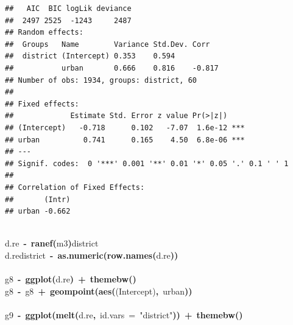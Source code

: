 \documentclass{article}
\makeatletter
\newcommand{\hlfunctioncall}[1]{\textcolor[rgb]{.5,0,.33}{\textbf{#1}}}%
\newcommand{\hlstring}[1]{\textcolor[rgb]{.6,.6,1}{#1}}%
\newcommand{\hlkeyword}[1]{\textbf{#1}}%
\newcommand{\hlargument}[1]{\textcolor[rgb]{.69,.25,.02}{#1}}%
\newcommand{\hlassignement}[1]{\textbf{#1}}%
\newcommand{\hlsymbol}[1]{#1}%
\newcommand{\hlstd}[1]{\textcolor[rgb]{0,0,0}{#1}}%
\newenvironment{kframe}{%
 \def\FrameCommand##1{\hskip\@totalleftmargin \hskip-\fboxsep
 \colorbox{shadecolor}{##1}\hskip-\fboxsep
     \hskip-\linewidth \hskip-\@totalleftmargin \hskip\columnwidth}%
 \MakeFramed {\advance\hsize-\width
   \@totalleftmargin\z@ \linewidth\hsize
   \@setminipage}}%
 {\par\unskip\endMakeFramed}
\newenvironment{knitrout}{}{} %
\makeatother
\begin{document}
\begin{knitrout}
{\begin{kframe}
\begin{verbatim}
##   AIC  BIC logLik deviance
##  2497 2525  -1243     2487
## Random effects:
##  Groups   Name        Variance Std.Dev. Corr   
##  district (Intercept) 0.353    0.594           
##           urban       0.666    0.816    -0.817 
## Number of obs: 1934, groups: district, 60
## 
## Fixed effects:
##             Estimate Std. Error z value Pr(>|z|)    
## (Intercept)   -0.718      0.102   -7.07  1.6e-12 ***
## urban          0.741      0.165    4.50  6.8e-06 ***
## ---
## Signif. codes:  0 '***' 0.001 '**' 0.01 '*' 0.05 '.' 0.1 ' ' 1 
## 
## Correlation of Fixed Effects:
##       (Intr)
## urban -0.662
\end{verbatim}
\begin{flushleft}
\ttfamily\noindent
\hspace*{\fill}\\
\hlstd{}\hlsymbol{d.re}{\ }\hlassignement{\usebox{\hlnormalsizeboxlessthan}-}{\ }\hlfunctioncall{ranef}\hlkeyword{(}\hlsymbol{m3}\hlkeyword{)}\hlkeyword{\usebox{\hlnormalsizeboxdollar}}\hlsymbol{district}\hspace*{\fill}\\
\hlstd{}\hlsymbol{d.re}\hlkeyword{\usebox{\hlnormalsizeboxdollar}}\hlsymbol{district}{\ }\hlassignement{\usebox{\hlnormalsizeboxlessthan}-}{\ }\hlfunctioncall{as.numeric}\hlkeyword{(}\hlfunctioncall{row.names}\hlkeyword{(}\hlsymbol{d.re}\hlkeyword{)}\hlkeyword{)}\hspace*{\fill}\\
\hlstd{}\hspace*{\fill}\\
\hlstd{}\hlsymbol{g8}{\ }\hlassignement{\usebox{\hlnormalsizeboxlessthan}-}{\ }\hlfunctioncall{ggplot}\hlkeyword{(}\hlsymbol{d.re}\hlkeyword{)}{\ }\hlkeyword{+}{\ }\hlfunctioncall{theme\usebox{\hlnormalsizeboxunderscore}bw}\hlkeyword{(}\hlkeyword{)}\hspace*{\fill}\\
\hlstd{}\hlsymbol{g8}{\ }\hlassignement{\usebox{\hlnormalsizeboxlessthan}-}{\ }\hlsymbol{g8}{\ }\hlkeyword{+}{\ }\hlfunctioncall{geom\usebox{\hlnormalsizeboxunderscore}point}\hlkeyword{(}\hlfunctioncall{aes}\hlkeyword{(}\hlsymbol{\usebox{\hlnormalsizeboxbacktick}(Intercept)\usebox{\hlnormalsizeboxbacktick}}\hlkeyword{,}{\ }\hlsymbol{urban}\hlkeyword{)}\hlkeyword{)}\hspace*{\fill}\\
\hlstd{}\hspace*{\fill}\\
\hlstd{}\hlsymbol{g9}{\ }\hlassignement{\usebox{\hlnormalsizeboxlessthan}-}{\ }\hlfunctioncall{ggplot}\hlkeyword{(}\hlfunctioncall{melt}\hlkeyword{(}\hlsymbol{d.re}\hlkeyword{,}{\ }\hlargument{id.vars}{\ }\hlargument{=}{\ }\hlstring{"district"}\hlkeyword{)}\hlkeyword{)}{\ }\hlkeyword{+}{\ }\hlfunctioncall{theme\usebox{\hlnormalsizeboxunderscore}bw}\hlkeyword{(}\hlkeyword{)}\hspace*{\fill}\\

\end{flushleft}
\end{kframe}}
\end{knitrout}
\end{document}
